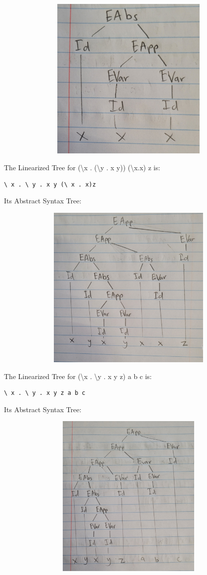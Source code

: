 \documentclass{article}
\theoremstyle{theorem}
\theoremstyle{definition}
\theoremstyle{remark}
\begin{document}
\includegraphics[width=15cm, height=8cm]{Report Images/week5_6.jpg}

The Linearized Tree for (\textbackslash x . (\textbackslash y . x y)) (\textbackslash x.x) z is:
\begin{lstlisting}
\ x . \ y . x y (\ x . x)z
\end{lstlisting}

Its Abstract Syntax Tree:

\includegraphics[width=15cm, height=8cm]{Report Images/week5_7.jpg}

The Linearized Tree for (\textbackslash x . \textbackslash y . x y z) a b c is:
\begin{lstlisting}
\ x . \ y . x y z a b c
\end{lstlisting}

Its Abstract Syntax Tree:

\includegraphics[width=15cm, height=8cm]{Report Images/week5_8.jpg}
\end{document}
